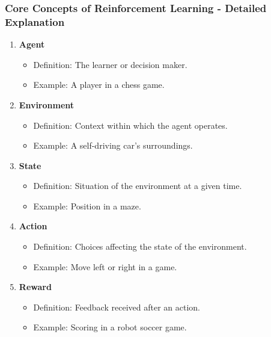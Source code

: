 \documentclass[aspectratio=169]{beamer}
\begin{document}
\begin{frame}[fragile]
    \frametitle{Core Concepts of Reinforcement Learning - Detailed Explanation}
    \begin{enumerate}
        \item \textbf{Agent}
        \begin{itemize}
            \item Definition: The learner or decision maker.
            \item Example: A player in a chess game.
        \end{itemize}
        
        \item \textbf{Environment}
        \begin{itemize}
            \item Definition: Context within which the agent operates.
            \item Example: A self-driving car's surroundings.
        \end{itemize}

        \item \textbf{State}
        \begin{itemize}
            \item Definition: Situation of the environment at a given time.
            \item Example: Position in a maze.
        \end{itemize}
        
        \item \textbf{Action}
        \begin{itemize}
            \item Definition: Choices affecting the state of the environment.
            \item Example: Move left or right in a game.
        \end{itemize}
        
        \item \textbf{Reward}
        \begin{itemize}
            \item Definition: Feedback received after an action.
            \item Example: Scoring in a robot soccer game.
        \end{itemize}
    \end{enumerate}
\end{frame}
\end{document}

